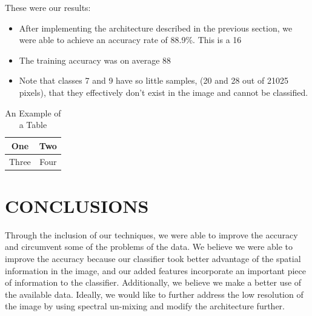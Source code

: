 \documentclass[letterpaper, 10 pt, conference]{ieeeconf}  %
\begin{document}
These were our results:

\begin{itemize}
\item After implementing the architecture described in the previous section, we were able to achieve an accuracy rate of 88.9\%. This is a 16%
\item The training accuracy was on average 88%
\item Note that classes 7 and 9 have so little samples, (20 and 28 out of 21025 pixels), that they effectively don’t exist in the image and cannot be classified. 
\end{itemize}



\begin{table}[h]
\caption{An Example of a Table}
\label{table_example}
\begin{center}
\begin{tabular}{|c||c|}
\hline
One & Two\\
\hline
Three & Four\\
\hline
\end{tabular}
\end{center}
\end{table}

   

\section{CONCLUSIONS}

Through the inclusion of our techniques, we were able to improve the accuracy and circumvent some of the problems of the data. 
We believe we were able to improve the accuracy because our classifier took better advantage of the spatial information in the image, and our added features incorporate an important piece of information to the classifier. Additionally, we believe we make a better use of the available data. Ideally, we would like to further address the low resolution of the image by using spectral un-mixing and modify the architecture further. 


\addtolength{\textheight}{-12cm}   %
\end{document}
